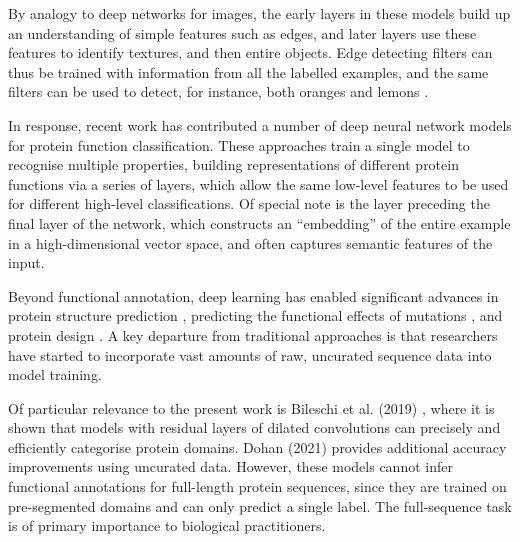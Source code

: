 By analogy to deep networks for images, the early layers in these models build up an understanding of simple features such as edges, and later layers use these features to identify textures, and then entire objects. Edge detecting filters can thus be trained with information from all the labelled examples, and the same filters can be used to detect, for instance, both oranges and lemons \cite{activationatlas}.

In response, recent work has contributed a number of deep neural network models for protein function classification\citep{ecpred,deepgo,prolango,deeploc,dspace,deepred,deepre,deepsf,littmann2021embeddings}. These approaches train a single model to recognise multiple properties, building representations of different protein functions via a series of layers, which allow the same low-level features to be used for different high-level classifications. Of special note is the layer preceding the final layer of the network, which constructs an ``embedding'' of the entire example in a high-dimensional vector space, and often captures semantic features of the input. 

Beyond functional annotation, deep learning has enabled significant advances in protein structure prediction \cite{alquraishi2019end, senior2020improved, Yang1496, yang2020improved, du2020energy, rao2021msa}, predicting the functional effects of mutations \cite{riesselman2018deep,rives2019biological,rao2019evaluating,frazer2020large}, and protein design \cite{yang2019machine, mazurenko2019machine, biswas2020low, madani2020progen,elnaggar2020prottrans, anishchenko2020novo, bryant2021deep}. A key departure from traditional approaches is that researchers have started to incorporate vast amounts of raw, uncurated sequence data into model training. 

Of particular relevance to the present work is Bileschi et al. (2019) \citep{bileschi}, where it is shown that models with residual layers \citep{resnet} of dilated convolutions \citep{dilatedconvolutions} can precisely and efficiently categorise protein domains.  Dohan (2021) \cite{dohan2021kdd} provides additional accuracy improvements using uncurated data. However, these models cannot infer functional annotations for full-length protein sequences, since they are trained on pre-segmented domains and can only predict a single label. The full-sequence task is of primary importance to biological practitioners.

